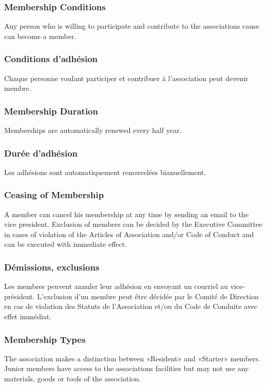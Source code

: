 \documentclass[12pt,a4paper,oneside]{article}
\newcounter{art}
\newcommand{\english}{    \switchcolumn[0]\noindent}
\newcommand{\french}{    \switchcolumn[1]\noindent}
\begin{document}
\begin{paracol}{2}
\english
	\subsubsection{Membership Conditions}
	Any person who is willing to participate and contribute to the associations cause can become a member.

\french
	\subsubsection{Conditions d’adhésion}
	Chaque personne voulant participer et contribuer à l’association peut devenir membre.
	\vspace{0.5cm}

\english
	\subsubsection{Membership Duration}
	Memberships are automatically renewed every half year.

\french
	\subsubsection{Durée d’adhésion}
	Les adhésions sont automatiquement renouvelées bianuellement.



\english
	\subsubsection{Ceasing of Membership}
	A member can cancel his membership at any time by sending an email to the vice president. Exclusion of members can be decided by the Executive Committee in cases of violation of the Articles of Association and/or Code of Conduct and can be executed with immediate effect.

\french
	\subsubsection{Démissions, exclusions}
	Les membres peuvent annuler leur adhésion en envoyant un courriel au vice-président. 
	L’exclusion d’un membre peut être décidée par le Comité de Direction en cas de violation des Statuts de l’Association et/ou du Code de Conduite avec effet immédiat.



\english
	\subsubsection{Membership Types}
	The association makes a distinction between «Resident» and «Starter» members.
	Junior members have access to the associations facilities but may not use any materials, goods or tools of the association. 


\end{paracol}
\end{document}
